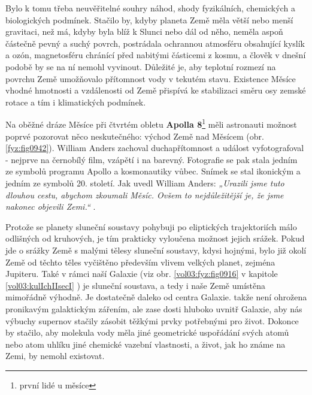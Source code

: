       Bylo k tomu třeba neuvěřitelné souhry náhod, shody fyzikálních, chemických a biologických
      podmínek. Stačilo by, kdyby planeta Země měla větší nebo menší gravitaci, než má, kdyby byla
      blíž k Slunci nebo dál od něho, neměla aspoň částečně pevný a suchý povrch, postrádala
      ochrannou atmosféru obsahující kyslík a ozón, magnetosféru chránící před nabitými částicemi z
      kosmu, a člověk v dnešní podobě by se na ní nemohl vyvinout. Důležité je, aby teplotní rozmezí
      na povrchu Země umožňovalo přítomnost vody v tekutém stavu. Existence Měsíce vhodné hmotnosti
      a vzdálenosti od Země přispívá ke stabilizaci směru osy zemské rotace a tím i klimatických
      podmínek.


      Na oběžné dráze Měsíce při čtvrtém obletu \textbf{Apolla 8}\footnote{první lidé u měsíce} měli
      astronauti možnost poprvé pozorovat něco neskutečného: východ Země nad Měsícem (obr.
      \ref{fyz:fig0942}). William Anders zachoval duchapřítomnost a událost vyfotografoval - nejprve
      na černobílý film, vzápětí i na barevný. Fotografie se pak stala jedním ze symbolů programu
      Apollo a kosmonautiky vůbec. Snímek se stal ikonickým a jedním ze symbolů 20. století. Jak
      uvedl William Anders: \emph{„Urazili jsme tuto dlouhou cestu, abychom zkoumali Měsíc. Ovšem to
      nejdůležitější je, že jsme nakonec objevili Zemi.“} \cite[s.~69]{Prikryl2019}.

      Protože se planety sluneční soustavy pohybuji po eliptických trajektoriích málo odlišných od
      kruhových, je tím prakticky vyloučena možnost jejich srážek. Pokud jde o srážky Země s malými
      tělesy sluneční soustavy, kdysi hojnými, bylo již okolí Země od těchto těles vyčištěno
      především vlivem velkých planet, zejména Jupiteru. Také v rámci naší Galaxie (viz obr.
      \ref{vol03:fyz:fig0916} v kapitole \ref{vol03:kulIchIIsecI} ) je sluneční soustava, a
      tedy i naše Země umístěna mimořádně výhodně. Je dostatečně daleko od centra Galaxie. takže
      není ohrožena pronikavým galaktickým zářením, ale zase dosti hluboko uvnitř Galaxie, aby nás
      výbuchy supernov stačily zásobit těžkými prvky potřebnými pro život. Dokonce by stačilo, aby
      molekula vody měla jiné geometrické uspořádání svých atomů nebo atom uhlíku jiné chemické
      vazební vlastnosti, a život, jak ho známe na Zemi, by nemohl existovat.

